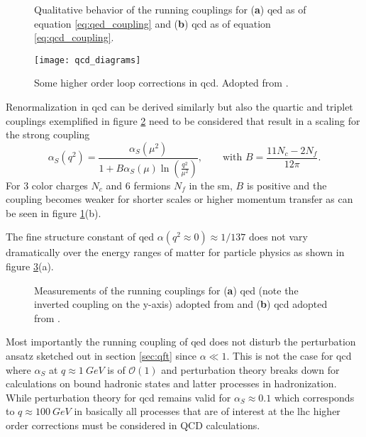 \begin{figure}
    \centering
    \caption[]{Qualitative behavior of the running couplings for (\textbf{a}) \ac{qed} as of equation \ref{eq:qed_coupling} and (\textbf{b}) \ac{qcd} as of equation \ref{eq:qcd_coupling}.}
    \label{fig:renorm_scaling}
\end{figure}
\begin{figure}[H]
    \centering
    \texttt{[image: qcd\_diagrams]}
    \caption[]{Some higher order loop corrections in \ac{qcd}. Adopted from \citep{thomson2013modern}.}
    \label{fig:qed_diagrams}
\end{figure}
Renormalization in \ac{qcd} can be derived similarly but also the quartic and triplet couplings exemplified in figure \ref{fig:qed_diagrams} need to be considered that result in a scaling for the strong coupling
\begin{equation}
    \alpha_S(q^2)=
    \frac{\alpha_S(\mu^2)}
    {1+B\alpha_S(\mu)
        \ln
        \left(\frac{q^2}{\mu^2}\right)}, \qquad \text{with } B=\frac{11N_c-2N_f}{12\pi}.
    \label{eq:qcd_coupling}
\end{equation}
For 3 color charges $N_c$ and 6 fermions $N_f$ in the \ac{sm}, $B$ is positive and the coupling becomes weaker for shorter scales or higher momentum transfer as can be seen in figure \ref{fig:renorm_scaling}(b).

The fine structure constant of \ac{qed} $\alpha(q^2\approx 0)\approx 1/137$ does not vary dramatically over the energy ranges of matter for particle physics as shown in figure \ref{fig:renorm_scaling_exp}(a).
\begin{figure}
    \centering
    \hspace{5mm}
    \caption[]{Measurements of the running couplings for (\textbf{a}) \ac{qed} (note the inverted coupling on the y-axis) adopted from \citep{opal2004tests} and (\textbf{b}) \ac{qcd} adopted from \citep{particle2022review}.}
    \label{fig:renorm_scaling_exp}
\end{figure}
Most importantly the running coupling of \ac{qed} does not disturb the perturbation ansatz sketched out in section \ref{sec:qft} since $\alpha\ll1$. This is not the case for \ac{qcd} where $\alpha_S$ at $q\approx\SI{1}{GeV}$ is of $\mathcal{O}(1)$ and perturbation theory breaks down for calculations on bound hadronic states and latter processes in hadronization. While perturbation theory for \ac{qcd} remains valid for $\alpha_S\approx 0.1$ which corresponds to $q\approx \SI{100}{GeV}$ in basically all processes that are of interest at the \ac{lhc} higher order corrections must be considered in QCD calculations.

